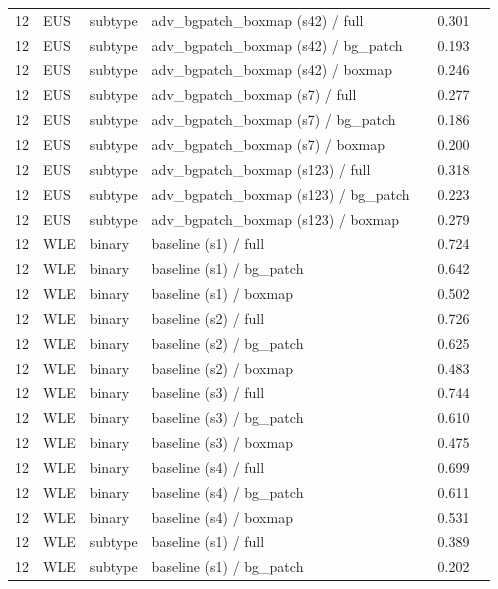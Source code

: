 \begin{longtable}{cL{1.1cm}L{1.5cm}L{5.6cm}ccc}
12 & EUS & subtype & adv\_bgpatch\_boxmap (s42) / full & \nl{} & 0.301 & \nl{} \\
12 & EUS & subtype & adv\_bgpatch\_boxmap (s42) / bg\_patch & \nl{} & 0.193 & \nl{} \\
12 & EUS & subtype & adv\_bgpatch\_boxmap (s42) / boxmap & \nl{} & 0.246 & \nl{} \\
12 & EUS & subtype & adv\_bgpatch\_boxmap (s7) / full & \nl{} & 0.277 & \nl{} \\
12 & EUS & subtype & adv\_bgpatch\_boxmap (s7) / bg\_patch & \nl{} & 0.186 & \nl{} \\
12 & EUS & subtype & adv\_bgpatch\_boxmap (s7) / boxmap & \nl{} & 0.200 & \nl{} \\
12 & EUS & subtype & adv\_bgpatch\_boxmap (s123) / full & \nl{} & 0.318 & \nl{} \\
12 & EUS & subtype & adv\_bgpatch\_boxmap (s123) / bg\_patch & \nl{} & 0.223 & \nl{} \\
12 & EUS & subtype & adv\_bgpatch\_boxmap (s123) / boxmap & \nl{} & 0.279 & \nl{} \\
12 & WLE & binary & baseline (s1) / full & \nl{} & 0.724 & \nl{} \\
12 & WLE & binary & baseline (s1) / bg\_patch & \nl{} & 0.642 & \nl{} \\
12 & WLE & binary & baseline (s1) / boxmap & \nl{} & 0.502 & \nl{} \\
12 & WLE & binary & baseline (s2) / full & \nl{} & 0.726 & \nl{} \\
12 & WLE & binary & baseline (s2) / bg\_patch & \nl{} & 0.625 & \nl{} \\
12 & WLE & binary & baseline (s2) / boxmap & \nl{} & 0.483 & \nl{} \\
12 & WLE & binary & baseline (s3) / full & \nl{} & 0.744 & \nl{} \\
12 & WLE & binary & baseline (s3) / bg\_patch & \nl{} & 0.610 & \nl{} \\
12 & WLE & binary & baseline (s3) / boxmap & \nl{} & 0.475 & \nl{} \\
12 & WLE & binary & baseline (s4) / full & \nl{} & 0.699 & \nl{} \\
12 & WLE & binary & baseline (s4) / bg\_patch & \nl{} & 0.611 & \nl{} \\
12 & WLE & binary & baseline (s4) / boxmap & \nl{} & 0.531 & \nl{} \\
12 & WLE & subtype & baseline (s1) / full & \nl{} & 0.389 & \nl{} \\
12 & WLE & subtype & baseline (s1) / bg\_patch & \nl{} & 0.202 & \nl{} \\

\end{longtable}
